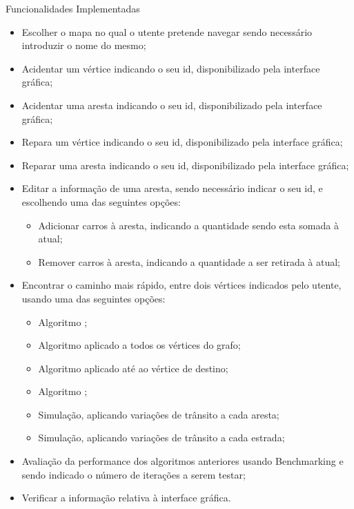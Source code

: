 \documentclass[relatorio.tex]{subfiles}
\begin{document}
\begin{table}[hbpt]
\caption{Funcionalidades Implementadas}
\label{tab:functionalities}
\begin{itemize}
\setlength{\parskip}{.2\parskip}
\item Escolher o mapa no qual o utente pretende navegar sendo necessário introduzir o nome do mesmo;
\item Acidentar um vértice indicando o seu id, disponibilizado pela interface gráfica;
\item Acidentar uma aresta indicando o seu id, disponibilizado pela interface gráfica;
\item Repara um vértice indicando o seu id, disponibilizado pela interface gráfica;
\item Reparar uma aresta indicando o seu id, disponibilizado pela interface gráfica;
\item Editar a informação de uma aresta, sendo necessário indicar o seu id, e escolhendo uma das seguintes opções:
    \begin{itemize}
    \item Adicionar carros à aresta, indicando a quantidade sendo esta somada à atual;
    \item Remover carros à aresta, indicando a quantidade a ser retirada à atual;
    \end{itemize}
\item Encontrar o caminho mais rápido, entre dois vértices indicados pelo utente, usando uma das seguintes opções:
    \begin{itemize}
    \item Algoritmo ;
    \item Algoritmo  aplicado a todos os vértices do grafo;
    \item Algoritmo  aplicado até ao vértice de destino;
    \item Algoritmo ;
    \item Simulação, aplicando variações de trânsito a cada aresta;
    \item Simulação, aplicando variações de trânsito a cada estrada;
    \end{itemize}
\item Avaliação da performance dos algoritmos anteriores usando Benchmarking e sendo indicado o número de iterações a serem testar;
\item Verificar a informação relativa à interface gráfica.
\end{itemize}
\end{table}
\end{document}
